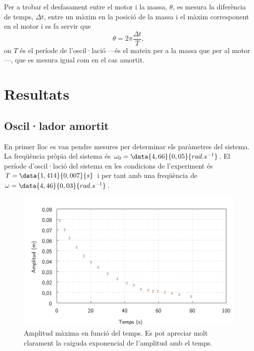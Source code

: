 \documentclass[12pt,a4paper]{article}
\begin{document}
Per a trobar el desfasament entre el motor i la massa, \( \theta \), es mesura la diferència de temps, \( \Delta t \), entre un màxim en la posició de la massa i el màxim corresponent en el motor i es fa servir que
\begin{equation}
  \theta = 2\pi \dfrac{\Delta t}{T}, 
\end{equation}
on \( T \) és el període de l'oscil·lació ---és el mateix per a la massa que per al motor---, que es mesura igual com en el cas amortit.  

\section{Resultats} \label{sec:resultats}
\subsection{Oscil·lador amortit}
En primer lloc es van pendre mesures per determinar els paràmetres del sistema. La freqüència pròpia del sistema és \( \omega_0 = \data{4,66}{0,05}{rad.s^{-1}} \). El període d'oscil·lació del sistema en les condicions de l'experiment és \( T = \data{1,414}{0,007}{s} \) i per tant amb una freqüència de \( \omega = \data{4,46}{0,03}{rad.s^{-1}} \). 

\begin{figure}[htb]
	\centering
	\includegraphics[scale=0.6]{amplitud.png}
	\caption{Amplitud màxima en funció del temps. Es pot apreciar molt clarament la caiguda exponencial de l'amplitud amb el temps.}
	\label{fig:amplitud en funcio del temps}
\end{figure}
\end{document}
